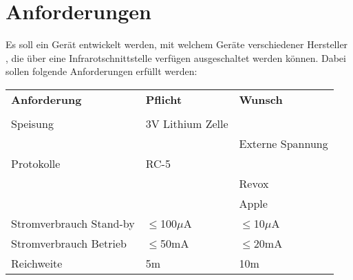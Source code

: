 



\section{Anforderungen}
Es soll ein Gerät entwickelt werden, mit welchem Geräte verschiedener 
Hersteller , die über eine Infrarotschnittstelle verfügen ausgeschaltet 
werden können. Dabei sollen folgende Anforderungen erfüllt werden: 

\begin{table}[h!]
  \begin{tabular}{@{}p{}p{}p{}}
    \rowcolor{white} \textbf{Anforderung}     & \textbf{Pflicht} & \textbf{Wunsch}\\
                                              &                  &                \\
    \rowcolor{white} Speisung                 & 3V Lithium Zelle &                \\
    \rowcolor{white}                          &                  & Externe Spannung\\
    \rowcolor{lgray} Protokolle               & RC-5             &                \\
    \rowcolor{lgray}                          &                  & Revox          \\
    \rowcolor{lgray}                          &                  & Apple          \\
    \rowcolor{white} Stromverbrauch Stand-by  & $\leq$100$\mu$A  & $\leq$10$\mu$A \\
    \rowcolor{lgray} Stromverbrauch Betrieb   & $\leq$50mA       & $\leq$20mA     \\
    \rowcolor{white} Reichweite               & 5m               & 10m            \\
  \end{tabular}
  \label{tab:anforderungen}
\end{table}

